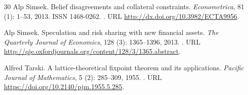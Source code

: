 \documentclass[11pt]{article}
\theoremstyle{plain}
\begin{document}
\begin{thebibliography}{30}
Alp Simsek.
\newblock Belief disagreements and collateral constraints.
\newblock \emph{Econometrica}, 81 (1): 1--53,
  2013{}.
\newblock ISSN 1468-0262.
\newblock {}.
\newblock URL \url{http://dx.doi.org/10.3982/ECTA9956}.

Alp Simsek.
\newblock Speculation and risk sharing with new financial assets.
\newblock \emph{The Quarterly Journal of Economics}, 128 (3):
  1365--1396, 2013{}.
\newblock {}.
\newblock URL \url{http://qje.oxfordjournals.org/content/128/3/1365.abstract}.

Alfred Tarski.
\newblock A lattice-theoretical fixpoint theorem and its applications.
\newblock \emph{Pacific Journal of Mathematics}, 5 (2):
  285--309, 1955.
\newblock {}.
\newblock URL \url{https://doi.org/10.2140/pjm.1955.5.285}.

\end{thebibliography}
\end{document}
